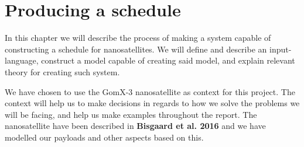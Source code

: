 \chapter{Producing a schedule} \label{cha:analysis}
In this chapter we will describe the process of making a system capable of constructing a schedule for nanosatellites. We will define and describe an input-language, construct a model capable of creating said model, and explain relevant theory for creating such system.

We have chosen to use the GomX-3 nanosatellite as context for this project. The context will help us to make decisions in regards to how we solve the problems we will be facing, and help us make examples throughout the report. The nanosatellite have been described in \textbf{Bisgaard et al. 2016}\cite{gomx3} and we have modelled our payloads and other aspects based on this.









